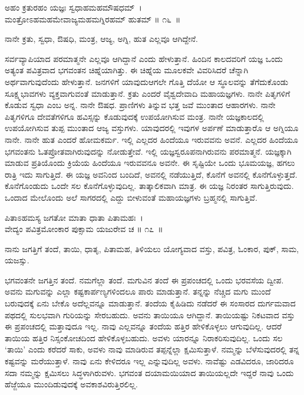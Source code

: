 \begin{shloka}
ಅಹಂ ಕ್ರತುರಹಂ ಯಜ್ಞಃ ಸ್ವಧಾಹಮಹಮೌಷಧಮ್~।\\ಮಂತ್ರೋಽಹಮಹಮೇವಾಜ್ಯಮಹಮಗ್ನಿರಹಮ್ ಹುತಮ್ \hfill॥ ೧೬~॥
\end{shloka}

\begin{artha}
ನಾನೇ ಕ್ರತು, ಸ್ವಧಾ, ಔಷಧಿ, ಮಂತ್ರ, ಆಜ್ಯ, ಅಗ್ನಿ, ಹುತ ಎಲ್ಲವೂ ಆಗಿದ್ದೇನೆ.
\end{artha}

ಸರ್ವವ್ಯಾಪಿಯಾದ ಪರಮಾತ್ಮನೇ ಎಲ್ಲವೂ ಆಗಿದ್ದಾನೆ ಎಂದು ಹೇಳುತ್ತಾನೆ. ಹಿಂದಿನ ಕಾಲ\-ದವರಿಗೆ ಯಜ್ಞ ಒಂದು ಅತ್ಯಂತ ಪವಿತ್ರವಾದ ಭಗವಂತನ ಚಿಹ್ನೆಯಾಗಿತ್ತು. ಈ ಚಿಹ್ನೆಯ ಮೂಲಕವೇ ವಿವರಿಸಿದರೆ ಚೆನ್ನಾಗಿ ಅರ್ಥವಾಗುವುದೆಂದು ಹೇಳುತ್ತಾನೆ. ಜನಗಳಿಗೆ ಯಾವುದು\break ಆಗಲೇ ಗೊತ್ತಿ ದೆಯೋ ಆ ಸ್ಥೂಲವನ್ನು ತೆಗೆದುಕೊಂಡು ಸೂಕ್ಷ್ಮಭಾವಗಳು ವ್ಯಕ್ತವಾಗುವಂತೆ ಮಾಡುತ್ತಾನೆ. ಕ್ರತು ಎಂದರೆ ವೈಶ್ವದೇವಾದಿ ಮಹಾಯಜ್ಞಗಳು. ನಾನೇ ಪಿತೃಗಳಿಗೆ ಕೊಡುವ ಸ್ವಧಾ ಎಂಬ ಅನ್ನ. ನಾನೇ ಔಷಧ. ಪ್ರಾಣಿಗಳು ತಿನ್ನುವ ಭತ್ತ ಜವೆ ಮುಂತಾದ ಆಹಾರಗಳು. ನಾನೇ ಪಿತೃಗಳಿಗೂ ದೇವತೆಗಳಿಗೂ ಹವಿಸ್ಸನ್ನು ಕೊಡುವುದಕ್ಕೆ ಉಪಯೋಗಿಸುವ ಮಂತ್ರ. ನಾನೇ ಯಜ್ಞಕಾಲದಲ್ಲಿ ಉಪಯೋಗಿಸುವ ತುಪ್ಪ ಮುಂತಾದ ಆಜ್ಯ ವಸ್ತುಗಳು. ಯಾವುದರಲ್ಲಿ ಇವುಗಳ ಅರ್ಪಣೆ ಮಾಡುತ್ತಾರೊ ಆ ಅಗ್ನಿಯೂ ನಾನೇ. ನಾನೇ ಹುತ ಎಂದರೆ ಹೋಮಕರ್ಮ. ಇಲ್ಲಿ ಎಲ್ಲದರ ಹಿಂದೆಯೂ ಇರುವವನು ಅವನೆ. ಎಲ್ಲದರ ಹಿಂದೆಯೂ ಭಗವಂತನು ಓತಪ್ರೋತವಾಗಿರುವುದನ್ನು ನೋಡುತ್ತೇವೆ. ಇಲ್ಲಿ ಯಜ್ಞಸ್ವರೂಪನಾಗಿರುವನು ಪರಮಾತ್ಮನೆ. ಯಜ್ಞಕ್ಕಾಗಿ ಮಾಡುವ ಪ್ರತಿಯೊಂದು ಕ್ರಿಯೆಯ ಹಿಂದೆಯೂ ಇರುವವನೂ ಅವನೇ. ಈ ಸೃಷ್ಟಿಯೇ ಒಂದು ಭೂಮಯಜ್ಞ, ಹಗಲು ರಾತ್ರಿ ಇದು ಸಾಗುತ್ತಿದೆ. ಈ ಯಜ್ಞ ಅವನಿಂದ ಬಂದಿದೆ, ಅವನಲ್ಲಿ ನಡೆಯುತ್ತಿದೆ, ಕೊನೆಗೆ ಅವನಲ್ಲಿ ಕೊನೆಗೊಳ್ಳುತ್ತದೆ. ಕೊನೆಗೊಂಡುದು ಒಂದೇ ಸಲ ಕೊನೆಗೊಳ್ಳುವುದಿಲ್ಲ. ತಾತ್ಕಾಲಿಕವಾಗಿ ಮಾತ್ರ. ಈ ಯಜ್ಞ ನಿರಂತರ ಸಾಗುತ್ತಿರುವುದು. ಒಂದಾದ ಮೇಲೊಂದು ಅಲೆ ಸಾಗರದಲ್ಲಿ ಎದ್ದು ಬೀಳುವಂತೆ ಮಹಾಯಜ್ಞಗಳು ಬ್ರಹ್ಮನಲ್ಲಿ ಸಾಗುತ್ತಿವೆ.

\begin{shloka}
ಪಿತಾಽಹಮಸ್ಯ ಜಗತೋ ಮಾತಾ ಧಾತಾ ಪಿತಾಮಹಃ~।\\ವೇದ್ಯಂ ಪವಿತ್ರಮೋಂಕಾರ ಪುಕ್ಸಾಮ ಯಜುರೇವ ಚ \hfill॥ ೧೭~॥
\end{shloka}

\begin{artha}
ನಾನು ಜಗತ್ತಿಗೆ ತಂದೆ, ತಾಯಿ, ಧಾತೃ, ಪಿತಾಮಹ, ತಿಳಿಯಲು ಯೋಗ್ಯವಾದ ವಸ್ತು, ಪವಿತ್ರ, ಓಂಕಾರ, ಪುಕ್, ಸಾಮ, ಯಜಸ್ಸು.
\end{artha}

ಭಗವಂತನೇ ಜಗತ್ತಿನ ತಂದೆ. ನಮಗೆಲ್ಲಾ ತಂದೆ. ಮಗುವಿನ ತಂದೆ ಈ ಪ್ರಪಂಚದಲ್ಲಿ ಒಂದು ಭರವಸೆಯ ದ್ವೀಪ. ಅವನು ಮಗುವನ್ನು ಎಲ್ಲಾ ಕಷ್ಟಕಾರ್ಪಣ್ಯಗಳಿಂದಲೂ ಪಾರು ಮಾಡುತ್ತಾನೆ. ತನ್ನನ್ನು ನೆಚ್ಚಿದ ಮಗು ಮುಂದೆ ಬರುವುದಕ್ಕೆ ಏನು ಬೇಕೊ ಅದೆಲ್ಲವನ್ನೂ ಮಾಡುತ್ತಾನೆ. ತಂದೆಯ ಕೈಹಿಡಿದು ನಡೆದರೆ ಈ ಸಂಸಾರದ ದುರ್ಗಮವಾದ ಪಥದಲ್ಲಿ ಸುಲಭವಾಗಿ ಗುರಿಯನ್ನು ಸೇರಬಹುದು. ಅವನು ತಾಯಿಯೂ ಆಗಿದ್ದಾನೆ. ತಾಯಿಯಷ್ಟು ನಿಕಟವಾದ ವಸ್ತು ಈ ಪ್ರಪಂಚದಲ್ಲಿ ಮತ್ತಾವುದೂ ಇಲ್ಲ. ನಾವು ಎಲ್ಲವನ್ನೂ ತಂದೆಯ ಹತ್ತಿರ ಹೇಳಿಕೊಳ್ಳಲು ಆಗುವುದಿಲ್ಲ. ಆದರೆ ತಾಯಿಯ ಹತ್ತಿರ ನಿಸ್ಸಂಕೋಚದಿಂದ ಹೇಳಿಕೊಳ್ಳಬಹುದು. ಅವಳು ಯಾರನ್ನೂ ನಿರಾಕರಿಸುವುದಿಲ್ಲ. ಒಂದು ಸಲ ‘ತಾಯಿ’ ಎಂದು ಕರೆದರೆ ಸಾಕು, ಅವಳು ನಾವು ಮಾಡಿರುವ ತಪ್ಪನ್ನೆಲ್ಲಾ ಕ್ಷಮಿಸುತ್ತಾಳೆ. ನಮ್ಮನ್ನು ಬೆಳೆಸುವುದರಲ್ಲಿ ತನ್ನ ಕಷ್ಟವನ್ನು ಮರೆಯುತ್ತಾಳೆ. ನಾವು ಏನು ಕೇಳಿದರೂ ಇಲ್ಲ ಎನ್ನುವುದಿಲ್ಲ ಅವಳು. ನಾವೆಷ್ಟು ಎಡವಿದರೂ, ಜಾರಿದರೂ ಸದಾ ನಮ್ಮನ್ನು ಕ್ಷಮಿಸಲು ಸಿದ್ಧಳಾಗಿರುವಳು. ಭಗವಂತ ದಯಾಮಯಿಯಾದ ತಾಯಿಯಲ್ಲದೇ ಇದ್ದರೆ ನಾವು ಒಂದು ಹೆಜ್ಜೆಯೂ ಮುಂದಿಡುವುದಕ್ಕೆ ಅವಕಾಶವಿರುತ್ತಿರಲಿಲ್ಲ.

